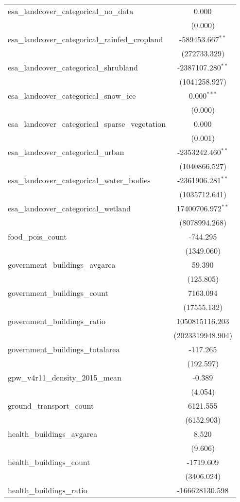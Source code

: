\begin{table}[!htbp]
\begin{tabular}{@{\extracolsep{5pt}}lc}
 esa_landcover_categorical_no_data & 0.000$^{}$ \\
  & (0.000) \\
 esa_landcover_categorical_rainfed_cropland & -589453.667$^{**}$ \\
  & (272733.329) \\
 esa_landcover_categorical_shrubland & -2387107.280$^{**}$ \\
  & (1041258.927) \\
 esa_landcover_categorical_snow_ice & 0.000$^{***}$ \\
  & (0.000) \\
 esa_landcover_categorical_sparse_vegetation & 0.000$^{}$ \\
  & (0.001) \\
 esa_landcover_categorical_urban & -2353242.460$^{**}$ \\
  & (1040866.527) \\
 esa_landcover_categorical_water_bodies & -2361906.281$^{**}$ \\
  & (1035712.641) \\
 esa_landcover_categorical_wetland & 17400706.972$^{**}$ \\
  & (8078994.268) \\
 food_pois_count & -744.295$^{}$ \\
  & (1349.060) \\
 government_buildings_avgarea & 59.390$^{}$ \\
  & (125.805) \\
 government_buildings_count & 7163.094$^{}$ \\
  & (17555.132) \\
 government_buildings_ratio & 1050815116.203$^{}$ \\
  & (2023319948.904) \\
 government_buildings_totalarea & -117.265$^{}$ \\
  & (192.597) \\
 gpw_v4r11_density_2015_mean & -0.389$^{}$ \\
  & (4.054) \\
 ground_transport_count & 6121.555$^{}$ \\
  & (6152.903) \\
 health_buildings_avgarea & 8.520$^{}$ \\
  & (9.606) \\
 health_buildings_count & -1719.609$^{}$ \\
  & (3406.024) \\
 health_buildings_ratio & -166628130.598$^{}$ \\

\end{tabular}
\end{table}
